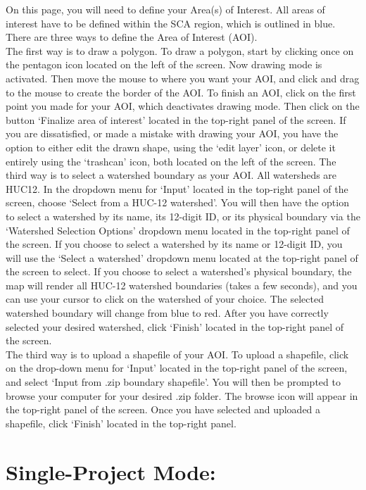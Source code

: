 \documentclass[
]{book}
\begin{document}
On this page, you will need to define your Area(s) of Interest. All areas of interest have to be defined within the SCA region, which is outlined in blue. There are three ways to define the Area of Interest (AOI).\\
The first way is to draw a polygon. To draw a polygon, start by clicking once on the pentagon icon located on the left of the screen. Now drawing mode is activated. Then move the mouse to where you want your AOI, and click and drag to the mouse to create the border of the AOI. To finish an AOI, click on the first point you made for your AOI, which deactivates drawing mode. Then click on the button `Finalize area of interest' located in the top-right panel of the screen. If you are dissatisfied, or made a mistake with drawing your AOI, you have the option to either edit the drawn shape, using the `edit layer' icon, or delete it entirely using the `trashcan' icon, both located on the left of the screen. The third way is to select a watershed boundary as your AOI. All watersheds are HUC12. In the dropdown menu for `Input' located in the top-right panel of the screen, choose `Select from a HUC-12 watershed'. You will then have the option to select a watershed by its name, its 12-digit ID, or its physical boundary via the `Watershed Selection Options' dropdown menu located in the top-right panel of the screen. If you choose to select a watershed by its name or 12-digit ID, you will use the `Select a watershed' dropdown menu located at the top-right panel of the screen to select. If you choose to select a watershed's physical boundary, the map will render all HUC-12 watershed boundaries (takes a few seconds), and you can use your cursor to click on the watershed of your choice. The selected watershed boundary will change from blue to red. After you have correctly selected your desired watershed, click `Finish' located in the top-right panel of the screen.\\
The third way is to upload a shapefile of your AOI. To upload a shapefile, click on the drop-down menu for `Input' located in the top-right panel of the screen, and select `Input from .zip boundary shapefile'. You will then be prompted to browse your computer for your desired .zip folder. The browse icon will appear in the top-right panel of the screen. Once you have selected and uploaded a shapefile, click `Finish' located in the top-right panel.

\hypertarget{single-project-mode}{%
\chapter{Single-Project Mode:}\label{single-project-mode}}
\end{document}
